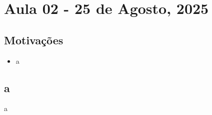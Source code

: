 \documentclass[../differential_forms.tex]{subfiles}
\begin{document}
\section{Aula 02 - 25 de Agosto, 2025}
\subsection{Motivações}
\begin{itemize}
	\item a
\end{itemize}
\subsection{a}
a
\end{document}
